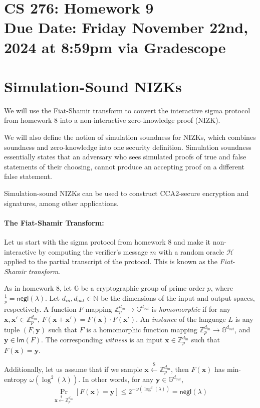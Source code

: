 \documentclass[11pt]{article}
\numberwithin{equation}{section}
\newcommand{\bfx}{\mathbf{x}}
\newcommand{\bfy}{\mathbf{y}}
\newcommand{\bbG}{\mathbb{G}}
\newcommand{\bbN}{\mathbb{N}}
\newcommand{\bbZ}{\mathbb{Z}}
\newcommand{\cH}{\mathcal{H}}
\newcommand{\secp}{\lambda}
\newcommand{\negl}{\mathsf{negl}}
\newcommand{\getsr}{\stackrel{\$}{\gets}}
\newcommand{\duedate}{Friday November 22nd, 2024 at 8:59pm via Gradescope}
\begin{document}
\section*{CS 276: Homework 9\\ {\small Due Date: \duedate} }

\section{Simulation-Sound NIZKs}
We will use the Fiat-Shamir transform to convert the interactive sigma protocol from homework 8 into a non-interactive zero-knowledge proof (NIZK). 

We will also define the notion of simulation soundness for NIZKs, which combines soundness and zero-knowledge into one security definition. Simulation soundness essentially states that an adversary who sees simulated proofs of true and false statements of their choosing, cannot produce an accepting proof on a different false statement. 

Simulation-sound NIZKs can be used to construct CCA2-secure encryption and signatures, among other applications.

\paragraph{The Fiat-Shamir Transform:}
Let us start with the sigma protocol from homework 8 and make it non-interactive by computing the verifier's message $m$ with a random oracle $\cH$ applied to the partial transcript of the protocol. This is known as the \textit{Fiat-Shamir transform}.\newline

As in homework 8, let $\bbG$ be a cryptographic group of prime order $p$, where $\frac{1}{p} = \negl(\secp)$. Let $d_{in}, d_{out} \in \bbN$ be the dimensions of the input and output spaces, respectively. A function $F$ mapping $\bbZ_p^{d_{in}} \to \bbG^{d_{out}}$ is \textit{homomorphic} if for any $\bfx, \bfx' \in \bbZ_p^{d_{in}}$, $F(\bfx + \bfx') = F(\bfx) \cdot F(\bfx')$. An \textit{instance} of the language $L$ is any tuple $(F, \bfy)$ such that $F$ is a homomorphic function mapping $\bbZ_p^{d_{in}} \to \bbG^{d_{out}}$, and $\bfy \in \mathsf{Im}(F)$. The corresponding \textit{witness} is an input $\bfx \in \bbZ_p^{d_{in}}$ such that $F(\bfx) = \bfy$.

Additionally, let us assume that if we sample $\bfx \getsr \bbZ_p^{d_{in}}$, then $F(\bfx)$ has min-entropy $\omega(\log^2(\secp))$. In other words, for any $\bfy \in \bbG^{d_{out}}$,
\[\Pr_{\bfx \getsr \bbZ_p^{d_{in}}}[F(\bfx) = \bfy] \leq 2^{- \omega(\log^2(\secp))} = \negl(\secp)\]
\end{document}
